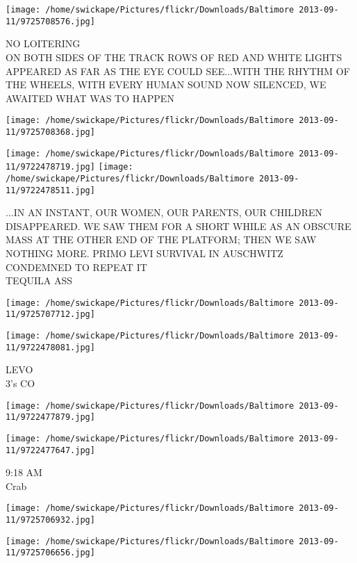 \documentclass[10pt,letterpaper]{article}
\begin{document}
\vspace{0.25in}
\texttt{[image: /home/swickape/Pictures/flickr/Downloads/Baltimore 2013-09-11/9725708576.jpg]}

NO LOITERING\\
ON BOTH SIDES OF THE TRACK ROWS OF RED AND WHITE LIGHTS APPEARED AS FAR AS THE EYE COULD SEE...WITH THE RHYTHM OF THE WHEELS, WITH EVERY HUMAN SOUND NOW SILENCED, WE AWAITED WHAT WAS TO HAPPEN
\pagebreak

\texttt{[image: /home/swickape/Pictures/flickr/Downloads/Baltimore 2013-09-11/9725708368.jpg]}

\vspace{0.25in}
\texttt{[image: /home/swickape/Pictures/flickr/Downloads/Baltimore 2013-09-11/9722478719.jpg]}
\texttt{[image: /home/swickape/Pictures/flickr/Downloads/Baltimore 2013-09-11/9722478511.jpg]}

...IN AN INSTANT, OUR WOMEN, OUR PARENTS, OUR CHILDREN DISAPPEARED.  WE SAW THEM FOR A SHORT WHILE AS AN OBSCURE MASS AT THE OTHER END OF THE PLATFORM; THEN WE SAW NOTHING MORE.  PRIMO LEVI  SURVIVAL IN AUSCHWITZ\\
CONDEMNED TO REPEAT IT\\
TEQUILA ASS
\pagebreak

\texttt{[image: /home/swickape/Pictures/flickr/Downloads/Baltimore 2013-09-11/9725707712.jpg]}

\vspace{0.25in}
\texttt{[image: /home/swickape/Pictures/flickr/Downloads/Baltimore 2013-09-11/9722478081.jpg]}

LEVO\\
3's CO
\pagebreak

\texttt{[image: /home/swickape/Pictures/flickr/Downloads/Baltimore 2013-09-11/9722477879.jpg]}

\vspace{0.25in}
\texttt{[image: /home/swickape/Pictures/flickr/Downloads/Baltimore 2013-09-11/9722477647.jpg]}

9:18 AM\\
Crab
\pagebreak

\texttt{[image: /home/swickape/Pictures/flickr/Downloads/Baltimore 2013-09-11/9725706932.jpg]}

\vspace{0.25in}
\texttt{[image: /home/swickape/Pictures/flickr/Downloads/Baltimore 2013-09-11/9725706656.jpg]}
\end{document}
